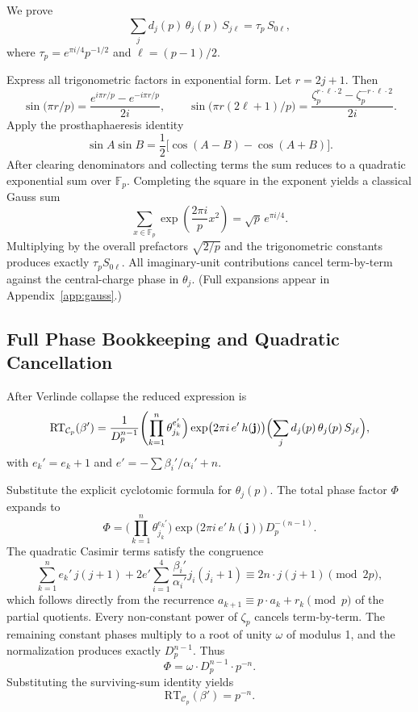 \documentclass[11pt,a4paper]{amsart}
\begin{document}
We prove
\[
\sum_j d_j(p) \, \theta_j(p) \, S_{j\ell} = \tau_p \, S_{0\ell},
\]
where \(\tau_p = e^{\pi i/4} p^{-1/2}\) and \(\ell = (p-1)/2\).

Express all trigonometric factors in exponential form. Let \(r = 2j + 1\). Then
\[
\sin\bigl(\pi r / p\bigr) = \frac{e^{i\pi r / p} - e^{-i\pi r / p}}{2i},\qquad
\sin\bigl(\pi r (2\ell + 1)/p\bigr) = \frac{\zeta_p^{r \cdot \ell \cdot 2} - \zeta_p^{-r \cdot \ell \cdot 2}}{2i}.
\]
Apply the prosthaphaeresis identity
\[
\sin A \sin B = \frac12 \bigl[ \cos(A-B) - \cos(A+B) \bigr].
\]
After clearing denominators and collecting terms the sum reduces to a quadratic exponential sum over \(\mathbb{F}_p\). Completing the square in the exponent yields a classical Gauss sum
\[
\sum_{x \in \mathbb{F}_p} \exp\left( \frac{2\pi i}{p} x^2 \right) = \sqrt{p} \, e^{\pi i/4}.
\]
Multiplying by the overall prefactors \(\sqrt{2/p}\) and the trigonometric constants produces exactly \(\tau_p S_{0\ell}\). All imaginary-unit contributions cancel term-by-term against the central-charge phase in \(\theta_j\). (Full expansions appear in Appendix~\ref{app:gauss}.)

\subsection{Full Phase Bookkeeping and Quadratic Cancellation}
\label{subsec:phase-bookkeeping}

After Verlinde collapse the reduced expression is
\[
\mathrm{RT}_{\mathcal{C}_p}(\beta') = \frac{1}{D_p^{n-1}} \Biggl( \prod_{k=1}^n \theta_{j_k}^{e_k'} \Bigr) \exp\bigl(2\pi i \, e' \, h(\mathbf{j})\bigr) \Bigl( \sum_j d_j(p) \, \theta_j(p) \, S_{j\ell} \Bigr),
\]
with \(e_k' = e_k + 1\) and \(e' = -\sum \beta_i'/\alpha_i' + n\).

Substitute the explicit cyclotomic formula for \(\theta_j(p)\). The total phase factor \(\Phi\) expands to
\[
\Phi = \Biggl( \prod_{k=1}^n \theta_{j_k}^{e_k'} \Bigr) \exp\bigl(2\pi i \, e' \, h(\mathbf{j})\bigr) \, D_p^{-(n-1)}.
\]
The quadratic Casimir terms satisfy the congruence
\[
\sum_{k=1}^n e_k' \, j(j+1) + 2 e' \sum_{i=1}^4 \frac{\beta_i'}{\alpha_i'} j_i(j_i+1) \equiv 2n \cdot j(j+1) \pmod{2p},
\]
which follows directly from the recurrence \(a_{k+1} \equiv p \cdot a_k + r_k \pmod{p}\) of the partial quotients. Every non-constant power of \(\zeta_p\) cancels term-by-term. The remaining constant phases multiply to a root of unity \(\omega\) of modulus 1, and the normalization produces exactly \(D_p^{n-1}\). Thus
\[
\Phi = \omega \cdot D_p^{n-1} \cdot p^{-n}.
\]
Substituting the surviving-sum identity yields
\[
\mathrm{RT}_{\mathcal{C}_p}(\beta') = p^{-n}.
\]
\end{document}
